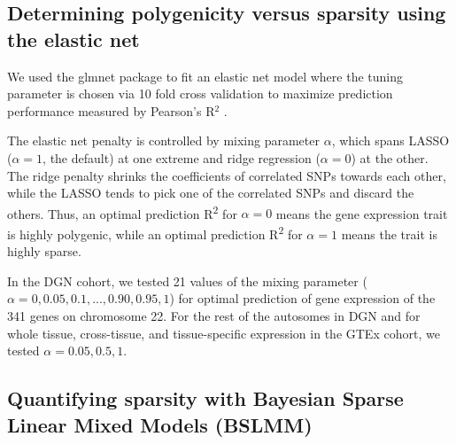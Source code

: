 \documentclass[10pt,letterpaper]{article}
\begin{document}
\subsection*{Determining polygenicity versus sparsity using the elastic
net}\label{determining-polygenicity-versus-sparsity-using-the-elastic-net}

We used the glmnet package to fit an elastic net model where the tuning parameter is chosen via 10 fold cross validation to maximize prediction performance measured by Pearson's R$^2$ \cite{Friedman_2010, Simon_2011}.


The elastic net penalty is controlled by mixing parameter \(\alpha\),
which spans LASSO (\(\alpha=1\), the default) \cite{Tibshirani_1996} at one extreme
and ridge regression (\(\alpha=0\)) \cite{Hoerl_1970} at the other. The ridge
penalty shrinks the coefficients of correlated SNPs towards each other,
while the LASSO tends to pick one of the correlated SNPs and discard the
others. Thus, an optimal prediction R\textsuperscript{2} for
\(\alpha=0\) means the gene expression trait is highly polygenic, while
an optimal prediction R\textsuperscript{2} for \(\alpha=1\) means the
trait is highly sparse. 

In the DGN cohort, we tested 21 values of the mixing parameter
(\(\alpha=0, 0.05, 0.1, ..., 0.90, 0.95, 1\)) for optimal prediction of
gene expression of the 341 genes on chromosome 22. For the rest of the
autosomes in DGN and for whole tissue, cross-tissue, and tissue-specific
expression in the GTEx cohort, we tested \(\alpha=0.05, 0.5, 1\).

\subsection*{Quantifying sparsity with Bayesian Sparse Linear Mixed
Models
(BSLMM)}\label{quantifying-sparsity-with-bayesian-sparse-linear-mixed-models-bslmm}
\end{document}
